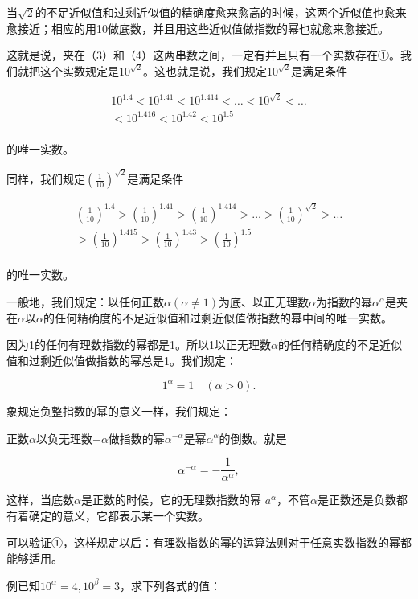 当\(\sqrt{2}\)的不足近似值和过剩近似值的精确度愈来愈高的时候，这两个近似值也愈来愈接近；相应的用10做底数，并且用这些近似值做指数的幂也就愈来愈接近。

这就是说，夹在（3）和（4）这两串数之间，一定有并且只有一个实数存在①。我们就把这个实数规定是\(10^{\sqrt{2}}\)。这也就是说，我们规定\(10^{\sqrt{2}}\)是满足条件

\[
\begin{array}{l} 10^{1.4} < 10^{1.41} < 10^{1.414} < \dots < 10^{\sqrt{2}} < \dots \\ < 10^{1.416} < 10^{1.42} < 10^{1.5} \\ \end{array}
\]

的唯一实数。

同样，我们规定\(\left(\frac{1}{10}\right)^{\sqrt{2}}\)是满足条件

\[
\begin{array}{l} \left(\frac{1}{10}\right)^{1.4} > \left(\frac{1}{10}\right)^{1.41} > \left(\frac{1}{10}\right)^{1.414} > \dots > \left(\frac{1}{10}\right)^{\sqrt{2}} > \dots \\ > \left(\frac{1}{10}\right)^{1.415} > \left(\frac{1}{10}\right)^{1.43} > \left(\frac{1}{10}\right)^{1.5} \\ \end{array}
\]

的唯一实数。

一般地，我们规定：以任何正数\(\alpha (\alpha \neq 1)\)为底、以正无理数\(\alpha\)为指数的幂\(\alpha^{\alpha}\)是夹在\(\alpha\)以\(\alpha\)的任何精确度的不足近似值和过剩近似值做指数的幂中间的唯一实数。

因为1的任何有理数指数的幂都是1。所以1以正无理数\(\alpha\)的任何精确度的不足近似值和过剩近似值做指数的幂总是1。我们规定：

\[
1^{\alpha} = 1 \quad (\alpha > 0).
\]

象规定负整指数的幂的意义一样，我们规定：

正数\(\alpha\)以负无理数\(-\alpha\)做指数的幂\(\alpha^{-\alpha}\)是幂\(\alpha^{\alpha}\)的倒数。就是

\[
\alpha^{- \alpha} = - \frac{1}{\alpha^{\alpha}},
\]

这样，当底数\(\alpha\)是正数的时候，它的无理数指数的幂
\(a^{\alpha}\)，不管\(\alpha\)是正数还是负数都有着确定的意义，它都表示某一个实数。

可以验证①，这样规定以后：有理数指数的幂的运算法则对于任意实数指数的幂都能够适用。

例已知\(10^{\alpha} = 4, 10^{\beta} = 3\)，求下列各式的值：

